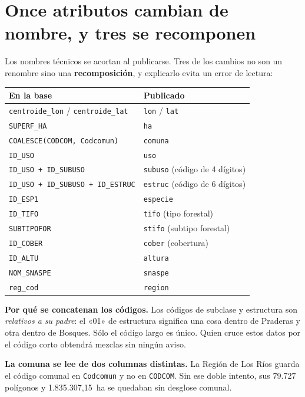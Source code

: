\documentclass[11pt,a4paper]{report}
\newcommand{\campo}[1]{\textcolor{conaf}{\textbf{#1}}}
\newcommand{\orig}[1]{\texttt{\small #1}}
\begin{document}
\section{Once atributos cambian de nombre, y tres se recomponen}

Los nombres técnicos se acortan al publicarse. Tres de los cambios no son un
renombre sino una \campo{recomposición}, y explicarlo evita un error de lectura:

\begin{longtable}{@{}L{6.2cm} L{6.2cm}@{}}
\toprule
\textbf{En la base} & \textbf{Publicado}\\
\midrule
\endhead
\orig{centroide\_lon} / \orig{centroide\_lat} & \orig{lon} / \orig{lat}\\
\orig{SUPERF\_HA} & \orig{ha}\\
\orig{COALESCE(CODCOM, Codcomun)} & \orig{comuna}\\
\orig{ID\_USO} & \orig{uso}\\
\orig{ID\_USO + ID\_SUBUSO} & \orig{subuso} (código de 4 dígitos)\\
\orig{ID\_USO + ID\_SUBUSO + ID\_ESTRUC} & \orig{estruc} (código de 6 dígitos)\\
\orig{ID\_ESP1} & \orig{especie}\\
\orig{ID\_TIFO} & \orig{tifo} (tipo forestal)\\
\orig{SUBTIPOFOR} & \orig{stifo} (subtipo forestal)\\
\orig{ID\_COBER} & \orig{cober} (cobertura)\\
\orig{ID\_ALTU} & \orig{altura}\\
\orig{NOM\_SNASPE} & \orig{snaspe}\\
\orig{reg\_cod} & \orig{region}\\
\bottomrule
\end{longtable}

\begin{alerta}
\campo{Por qué se concatenan los códigos.} Los códigos de subclase y estructura
son \emph{relativos a su padre}: el «01» de estructura significa una cosa dentro
de Praderas y otra dentro de Bosques. Sólo el código largo es único. Quien
cruce estos datos por el código corto obtendrá mezclas sin ningún aviso.
\end{alerta}

\begin{nota}
\campo{La comuna se lee de dos columnas distintas.} La Región de Los Ríos guarda
el código comunal en \orig{Codcomun} y no en \orig{CODCOM}. Sin ese doble
intento, sus 79.727 polígonos y 1.835.307,15~ha se quedaban sin desglose
comunal.
\end{nota}
\end{document}
